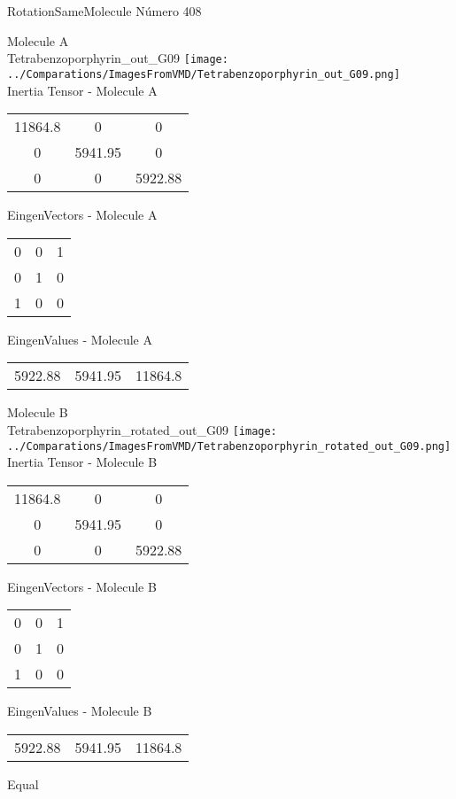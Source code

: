 \vtab[-2cm]
\begin{center}
{\large RotationSameMolecule \tab Número 408}
\end{center}
\begin{multicols}{2}
\begin{center}

Molecule A \\ 
Tetrabenzoporphyrin\_out\_G09
\texttt{[image: ../Comparations/ImagesFromVMD/Tetrabenzoporphyrin\_out\_G09.png]}
\\
Inertia Tensor - Molecule A \\
\vtab

\begin{tabular}{|c c c|}
11864.8	 & 	0	 & 	0	 \\
0	 & 	5941.95	 & 	0	 \\
0	 & 	0	 & 	5922.88
\end{tabular}

\vtab
 EingenVectors - Molecule A     \\
\vtab
\begin{tabular}{|c c c|}
0	 & 	0	 & 	1	 \\
0	 & 	1	 & 	0	 \\
1	 & 	0	 & 	0
\end{tabular}

\vtab
 EingenValues - Molecule A     \\
\vtab
\begin{tabular}{|c c c|}
5922.88	 & 	5941.95	 & 	11864.8	 \\
\end{tabular}
\columnbreak

Molecule B \\ 
Tetrabenzoporphyrin\_rotated\_out\_G09
\texttt{[image: ../Comparations/ImagesFromVMD/Tetrabenzoporphyrin\_rotated\_out\_G09.png]}
\\
Inertia Tensor - Molecule B \\
\vtab

\begin{tabular}{|c c c|}
11864.8	 & 	0	 & 	0	 \\
0	 & 	5941.95	 & 	0	 \\
0	 & 	0	 & 	5922.88
\end{tabular}

\vtab
 EingenVectors - Molecule B     \\
\vtab
\begin{tabular}{|c c c|}
0	 & 	0	 & 	1	 \\
0	 & 	1	 & 	0	 \\
1	 & 	0	 & 	0
\end{tabular}

\vtab
 EingenValues - Molecule B     \\
\vtab
\begin{tabular}{|c c c|}
5922.88	 & 	5941.95	 & 	11864.8	 \\
\end{tabular}

\end{center}
\end{multicols}
\begin{center}
\vtab
\vtab
\textcolor{NavyBlue}{\Large Equal}
\end{center}

